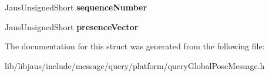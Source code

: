 \begin{DoxyCompactItemize}
\item 
\hypertarget{struct_query_global_pose_message_struct_a70d83623e2ef28d773b5fb496ddecb92}{\-Jaus\-Unsigned\-Short {\bfseries sequence\-Number}}\label{struct_query_global_pose_message_struct_a70d83623e2ef28d773b5fb496ddecb92}

\item 
\hypertarget{struct_query_global_pose_message_struct_ab5f01750a0a530521bbde57a29463a92}{\-Jaus\-Unsigned\-Short {\bfseries presence\-Vector}}\label{struct_query_global_pose_message_struct_ab5f01750a0a530521bbde57a29463a92}

\end{DoxyCompactItemize}


\-The documentation for this struct was generated from the following file\-:\begin{DoxyCompactItemize}
\item 
lib/libjaus/include/message/query/platform/query\-Global\-Pose\-Message.\-h\end{DoxyCompactItemize}

